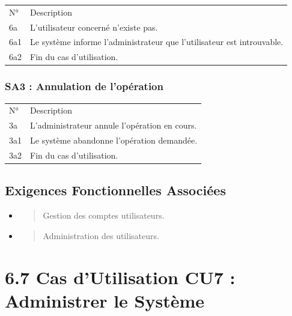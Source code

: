 \documentclass[
]{book}
\begin{document}
\begin{longtable}[]{@{}ll@{}}
\toprule
\endhead
N° & Description \\
6a & L'utilisateur concerné n'existe pas. \\
6a1 & Le système informe l'administrateur que l'utilisateur est
introuvable. \\
6a2 & Fin du cas d'utilisation. \\
\bottomrule
\end{longtable}

\hypertarget{sa3-annulation-de-lopuxe9ration-2}{%
\subsubsection{SA3 : Annulation de
l'opération}\label{sa3-annulation-de-lopuxe9ration-2}}

\begin{longtable}[]{@{}ll@{}}
\toprule
\endhead
N° & Description \\
3a & L'administrateur annule l'opération en cours. \\
3a1 & Le système abandonne l'opération demandée. \\
3a2 & Fin du cas d'utilisation. \\
\bottomrule
\end{longtable}

\hypertarget{exigences-fonctionnelles-associuxe9es-5}{%
\subsection{Exigences Fonctionnelles
Associées}\label{exigences-fonctionnelles-associuxe9es-5}}

\begin{itemize}
\item
  \begin{quote}
  Gestion des comptes utilisateurs.
  \end{quote}
\item
  \begin{quote}
  Administration des utilisateurs.
  \end{quote}
\end{itemize}

\hypertarget{cas-dutilisation-cu7-administrer-le-systuxe8me}{%
\section{6.7 Cas d'Utilisation CU7 : Administrer le
Système}\label{cas-dutilisation-cu7-administrer-le-systuxe8me}}
\end{document}
